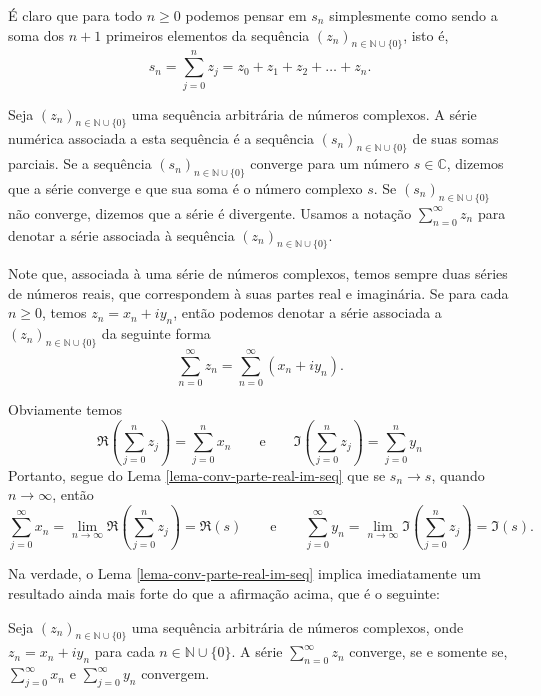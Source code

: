 É claro que para todo $n\geqslant 0$ podemos pensar em $s_n$ simplesmente como sendo 
a soma dos $n+1$ primeiros elementos da sequência $(z_n)_{n\in\mathbb{N}\cup\{0\}}$, 
isto é, 
\[
s_n  = \sum_{j=0}^n z_j = z_0+z_1+z_2+\ldots+z_n.
\]

\begin{definicao}
Seja $(z_n)_{n\in\mathbb{N}\cup\{0\}}$ uma sequência arbitrária de números complexos.
A série numérica associada a esta sequência é a sequência $(s_n)_{n\in\mathbb{N}\cup\{0\}}$
de suas somas parciais. 
Se a sequência $(s_n)_{n\in\mathbb{N}\cup\{0\}}$ converge 
para um número $s\in\mathbb{C}$, 
dizemos que a série converge e que sua soma é o número complexo $s$. 
Se $(s_n)_{n\in\mathbb{N}\cup\{0\}}$ não converge, 
dizemos que a série é divergente. 
Usamos a notação $\sum_{n=0}^{\infty} z_n$ para denotar a série associada
à sequência $(z_n)_{n\in\mathbb{N}\cup\{0\}}$.
\label{def-series-num-complexos}
\end{definicao}

Note que, associada à uma série de números complexos, temos sempre duas séries de
números reais, que correspondem à suas partes real e imaginária. 
Se para cada $n\geqslant 0$, temos $z_n=x_n+iy_n$,  então
podemos denotar a série associada a $(z_n)_{n\in\mathbb{N}\cup\{0\}}$ 
da seguinte forma
\[
\sum_{n=0}^{\infty} z_n = \sum_{n=0}^{\infty} (x_n+iy_n).
\]

Obviamente temos 
\[
\Re\left( \sum_{j=0}^{n} z_j\right) = \sum_{j=0}^{n} x_n
\qquad\text{e}\qquad
\Im\left( \sum_{j=0}^{n} z_j\right) = \sum_{j=0}^{n} y_n
\]
Portanto, segue do Lema \ref{lema-conv-parte-real-im-seq} que se $s_n \to s$, quando $n\to\infty$, então 
\[
\sum_{j=0}^{\infty} x_n
=
\lim_{n\to\infty} \Re\left( \sum_{j=0}^{n} z_j\right) = \Re(s)
\qquad\text{e}\qquad
\sum_{j=0}^{\infty} y_n
=
\lim_{n\to\infty} \Im\left( \sum_{j=0}^{n} z_j\right) = \Im(s).
\]

Na verdade, o Lema \ref{lema-conv-parte-real-im-seq} implica imediatamente um resultado 
ainda mais forte do que a afirmação acima, que é o seguinte:

\begin{teorema}
Seja $(z_n)_{n\in\mathbb{N}\cup\{0\}}$ uma sequência arbitrária de 
números complexos, onde $z_n=x_n+iy_n$ para cada $n\in\mathbb{N}\cup\{0\}$.
A série $\sum_{n=0}^{\infty}z_n$ converge, se e somente se,
$\sum_{j=0}^{\infty} x_n$ e $\sum_{j=0}^{\infty} y_n$ convergem.
\end{teorema}



